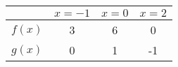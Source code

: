 \begin{center}
    \begin{tabular}{|c|c|c|c|} 
        \hline
               & $x=-1$ & $x = 0$ & $x = 2$ \\ 
        \hline
        $f(x)$ & 3      & 6       & 0       \\ 
        \hline
        $g(x)$ & 0      & 1       & -1       \\ 
        \hline
    \end{tabular}
\end{center}  